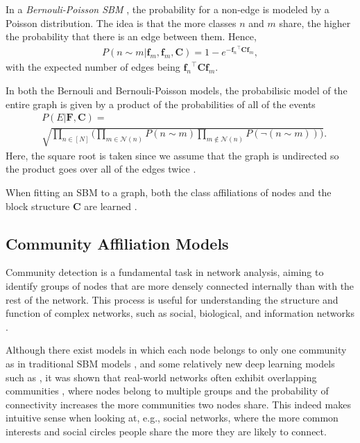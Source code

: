 \documentclass{article}
\theoremstyle{plain}
\theoremstyle{definition}
\theoremstyle{remark}
\newcommand{\ron}[1]{{{\textcolor{red}{\textbf{[Ron:} {#1}\textbf{]}}}}}
\begin{document}
In a \emph{Bernouli-Poisson SBM} \cite{yang2013BigClam,zhou2015bernoullipoisson, shchur2019overlapping}, the probability for a non-edge is modeled by a Poisson distribution. The idea is that the more classes $n$ and $m$ share, the higher the probability that there is an edge between them.  Hence,
\begin{align}
\label{eqn:ber_poi}    
P(n\sim m|\mathbf{f}_m,\mathbf{f}_m,\mathbf{C}) =1 - e^{-{\mathbf{f}_n}^\top  \mathbf{C} \mathbf{f}_m}, 
\end{align}
with the expected number of edges being ${\mathbf{f}_n}^\top  \mathbf{C} \mathbf{f}_m$.

In both the Bernouli and Bernouli-Poisson models, the probabilisic model of the entire graph is given by a product of the probabilities of all of the events
\smallskip
\begin{align*}
\label{eqn:prob_prod}
    & P(E|\mathbf{F},\mathbf{C}) = \\ & \sqrt{\underset{n \in [N]} {\prod}\Big(\underset{m\in \mathcal{N}(n)}{\prod}P(n \sim m)\underset{m \notin \mathcal{N}(n)}{\prod} P(\neg(n \sim m))\Big)}.
\end{align*}
Here, the square root is taken since we assume that the graph is undirected so the product goes over all of the edges twice \cite{aicher2015wsbm,morup2011infinite}. 

When fitting an SBM to a graph, both the class affiliations of nodes and the block structure $\mathbf{C}$ are learned %
\cite{snijders1997sbm_estimation1,nowicki2001sbm_estimation2,latouche2012variational_sbm_estimation}.


\subsection{Community Affiliation Models}

Community detection is a fundamental task in network analysis, aiming to identify groups of nodes that are more densely connected internally than with the rest of the network. This process is useful for understanding the structure and function of complex networks, such as social, biological, and information networks \cite{fortunato2016community}.

Although there exist models in which each node belongs to only one community as in traditional SBM models \cite{holland1983stochastic}, and some relatively new deep learning models such as \cite{cavallari2017learning},
it was shown that real-world networks often exhibit overlapping communities \cite{yang2014structure,yang2013BigClam}, where nodes belong to multiple groups and the probability of connectivity increases the more communities two nodes share. This indeed makes intuitive sense when looking at, e.g., social networks, where the more common interests and social circles people share the more they are likely to connect.  
\end{document}
